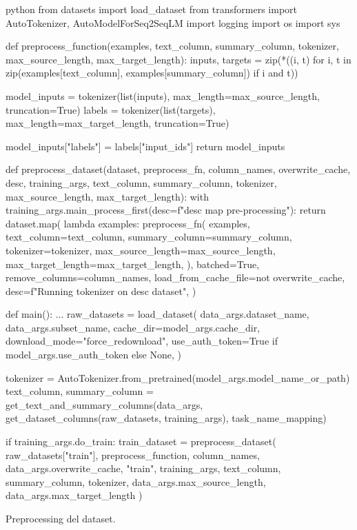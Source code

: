 \documentclass[12pt,a4paper,twoside,openright]{book}
\begin{document}
\begin{customcode}
\begin{mintedbox}{python}
from datasets import load_dataset
from transformers import AutoTokenizer, AutoModelForSeq2SeqLM
import logging
import os
import sys 

def preprocess_function(examples, text_column, summary_column, tokenizer, max_source_length, max_target_length):
    inputs, targets = zip(*((i, t) for i, t in zip(examples[text_column], examples[summary_column]) if i and t))

    model_inputs = tokenizer(list(inputs), max_length=max_source_length, truncation=True)
    labels = tokenizer(list(targets), max_length=max_target_length, truncation=True)

    model_inputs["labels"] = labels["input_ids"]
    return model_inputs

def preprocess_dataset(dataset, preprocess_fn, column_names, overwrite_cache, desc, training_args, text_column, summary_column, tokenizer, max_source_length, max_target_length):
    with training_args.main_process_first(desc=f"{desc} map pre-processing"):
        return dataset.map(
            lambda examples: preprocess_fn(
                examples,
                text_column=text_column,
                summary_column=summary_column,
                tokenizer=tokenizer,
                max_source_length=max_source_length,
                max_target_length=max_target_length,
            ),
            batched=True,
            remove_columns=column_names,
            load_from_cache_file=not overwrite_cache,
            desc=f"Running tokenizer on {desc} dataset",
        )  

def main(): 
    ...
    raw_datasets = load_dataset(
        data_args.dataset_name,
        data_args.subset_name,
        cache_dir=model_args.cache_dir,
        download_mode="force_redownload",
        use_auth_token=True if model_args.use_auth_token else None,
    )

    tokenizer = AutoTokenizer.from_pretrained(model_args.model_name_or_path)
    text_column, summary_column = get_text_and_summary_columns(data_args, get_dataset_columns(raw_datasets, training_args), task_name_mapping)

    if training_args.do_train:
        train_dataset = preprocess_dataset(
            raw_datasets["train"],
            preprocess_function,
            column_names,
            data_args.overwrite_cache,
            "train",
            training_args,
            text_column,
            summary_column,
            tokenizer,
            data_args.max_source_length,    
            data_args.max_target_length
        )
\end{mintedbox}
\caption{Preprocessing del dataset.}
\label{lst:preprocessing}
\end{customcode}
\end{document}
